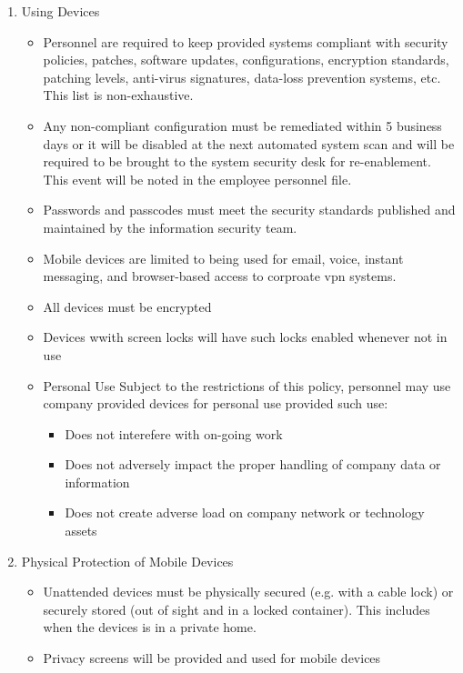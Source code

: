 \documentclass[stu]{apa7}
\begin{document}
\begin{enumerate}
\begin{enumerate}
\item Using Devices
\label{sec:org44d21e9}

\begin{itemize}
\item Personnel are required to keep provided systems compliant with security policies, patches, software updates, configurations, encryption standards, patching levels, anti-virus signatures, data-loss prevention systems, etc. This list is non-exhaustive.
\item Any non-compliant configuration must be remediated within 5 business days or it will be disabled at the next automated system scan and will be required to be brought to the system security desk for re-enablement. This event will be noted in the employee personnel file.
\item Passwords and passcodes must meet the security standards published and maintained by the information security team.
\item Mobile devices are limited to being used for email, voice, instant messaging, and browser-based access to corproate vpn systems.
\item All devices must be encrypted
\item Devices wwith screen locks will have such locks enabled whenever not in use

\item Personal Use
Subject to the restrictions of this policy, personnel may use company provided devices for personal use provided such use:
\begin{itemize}
\item Does not interefere with on-going work
\item Does not adversely impact the proper handling of company data or information
\item Does not create adverse load on company network or technology assets
\end{itemize}
\end{itemize}

\item Physical Protection of Mobile Devices
\label{sec:orgaface19}

\begin{itemize}
\item Unattended devices must be physically secured (e.g. with a cable lock) or securely stored (out of sight and in a locked container). This includes when the devices is in a private home.
\item Privacy screens will be provided and used for mobile devices
\end{itemize}
\end{enumerate}


\end{enumerate}
\end{document}
